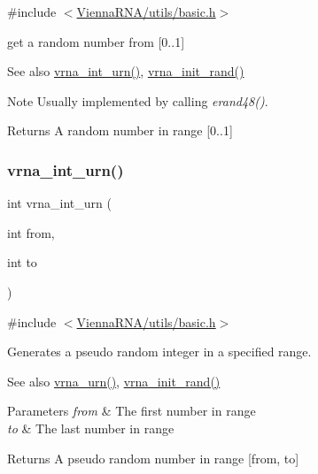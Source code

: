 {\ttfamily \#include $<$\hyperlink{utils_2basic_8h}{Vienna\+R\+N\+A/utils/basic.\+h}$>$}



get a random number from \mbox{[}0..1\mbox{]} 

\begin{DoxySeeAlso}{See also}
\hyperlink{group__utils_ga46111bb3747dbcf4609f0d40ae169ad9}{vrna\+\_\+int\+\_\+urn()}, \hyperlink{group__utils_ga0ad1f40ea316e5c5918695c35613027a}{vrna\+\_\+init\+\_\+rand()} 
\end{DoxySeeAlso}
\begin{DoxyNote}{Note}
Usually implemented by calling {\itshape erand48()}. 
\end{DoxyNote}
\begin{DoxyReturn}{Returns}
A random number in range \mbox{[}0..1\mbox{]} 
\end{DoxyReturn}
\mbox{\label{group__utils_ga46111bb3747dbcf4609f0d40ae169ad9}} 
\subsubsection{\texorpdfstring{vrna\+\_\+int\+\_\+urn()}{vrna\_int\_urn()}}
{\footnotesize\ttfamily int vrna\+\_\+int\+\_\+urn (\begin{DoxyParamCaption}\item[{int}]{from,  }\item[{int}]{to }\end{DoxyParamCaption})}



{\ttfamily \#include $<$\hyperlink{utils_2basic_8h}{Vienna\+R\+N\+A/utils/basic.\+h}$>$}



Generates a pseudo random integer in a specified range. 

\begin{DoxySeeAlso}{See also}
\hyperlink{group__utils_ga384e256ebb295d04a14426179db0dd6e}{vrna\+\_\+urn()}, \hyperlink{group__utils_ga0ad1f40ea316e5c5918695c35613027a}{vrna\+\_\+init\+\_\+rand()} 
\end{DoxySeeAlso}

\begin{DoxyParams}{Parameters}
{\em from} & The first number in range \\
\hline
{\em to} & The last number in range \\
\hline
\end{DoxyParams}
\begin{DoxyReturn}{Returns}
A pseudo random number in range \mbox{[}from, to\mbox{]} 
\end{DoxyReturn}
\mbox{\label{group__utils_gad3bbe8d01afb1310609cb018d5290550}} 
